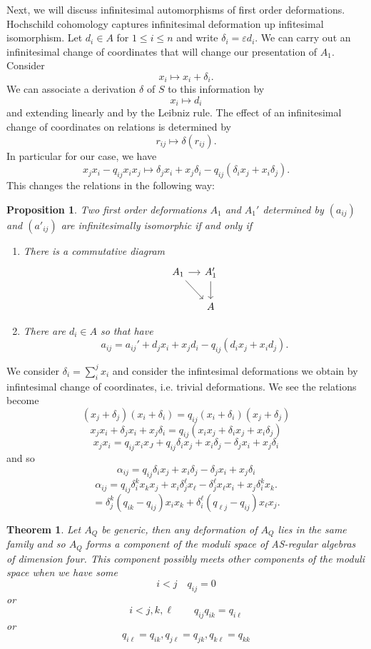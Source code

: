 \documentclass{article}
\newtheorem{proposition}{Proposition}
\newtheorem{theorem}{Theorem}
\begin{document}
Next, we will discuss infinitesimal automorphisms of first order deformations.  Hochschild cohomology captures infinitesimal deformation up infitesimal isomorphism.  Let $d_i \in A$ for $1 \leq i \leq n$ and write $\delta_i = \varepsilon d_i$.  We can carry out an infinitesimal change of coordinates that will change our presentation of $A_1$.
Consider
$$x_i \mapsto x_i+\delta_i.$$
We can associate a derivation $\delta$ of $S$ to this information by
$$x_i \mapsto d_i$$ and extending linearly and by the Leibniz rule.
The effect of an infinitesimal change of coordinates on relations is determined
by $$ r_{ij} \mapsto \delta(r_{ij}).$$
In particular for our case, we have
$$ x_jx_i - q_{ij} x_ix_j \mapsto \delta_jx_i+x_j\delta_i -q_{ij} (\delta_i x_j+
x_i\delta_j).$$
This changes the relations in the following way:
\begin{proposition}
Two first order deformations $A_1$ and $A_1'$ determined by
$(a_{ij})$ and $(a'_{ij})$ are infinitesimally isomorphic
  if and only if
  \begin{enumerate}
  \item There is a commutative diagram
   $$\begin{tikzcd}[column sep=small]
A_1 \arrow{r}  \arrow{rd} 
  & A_1' \arrow{d} \\
    & A
\end{tikzcd}$$
\item There are $d_i \in A$ so that
  have $$
  a_{ij} = a_{ij}' + d_j x_i + x_j d_i -q_{ij}(d_i x_j + x_id_j).$$
  \end{enumerate}
\end{proposition}

We consider $\delta_i = \sum^j_i x_i$ and consider the infintesimal deformations we obtain by infintesimal change of coordinates, i.e. trivial deformations.
We see the relations become
$$(x_j+\delta_j) (x_i+\delta_i) = q_{ij}(x_i + \delta_i)(x_j+\delta_j)$$
$$x_jx_i + \delta_jx_i + x_j\delta_i =q_{ij}(x_ix_j + \delta_ix_j + x_i\delta_j)$$
$$x_jx_i = q_{ij} x_ix_J+q_{ij}\delta_ix_j + x_i\delta_j - \delta_jx_i + x_j\delta_i$$
and so
$$\alpha_{ij} =  q_{ij}\delta_ix_j + x_i\delta_j - \delta_jx_i + x_j\delta_i$$
$$ \alpha_{ij} = q_{ij}\delta_i^kx_kx_j + x_i\delta_j^\ell x_\ell - \delta_j^\ell x_\ell x_i + x_j\delta_i^k x_k.$$
$$ = \delta_j^k(q_{ik}-q_{ij})x_ix_k + \delta_i^\ell (q_{\ell j} -q_{ij})x_\ell x_j.$$

\begin{theorem}
  Let $A_Q$ be generic, then any deformation of $A_Q$ lies in the same family and so $A_Q$ forms a component of the moduli space of AS-regular algebras of dimension four.  This component possibly meets other components of the moduli space when we have some 
  $$i<j \quad q_{ij} = 0$$
  or $$i<j,k,\ell \quad \quad q_{ij}q_{ik} = q_{i\ell}$$
  or
 $$q_{i\ell} = q_{ik},q_{j\ell} = q_{jk}, q_{k\ell} = q_{kk}$$
\end{theorem}
\end{document}

